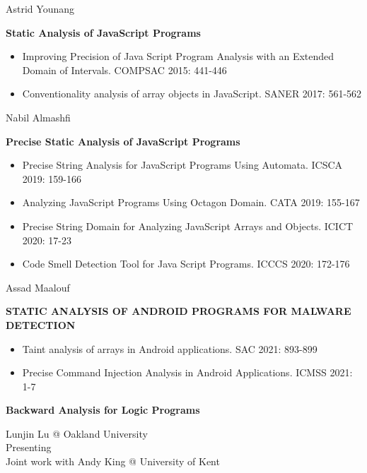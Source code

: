 \documentclass{beamer}
\begin{document}
\begin{frame}{Astrid Younang}

{\large\bf Static Analysis of JavaScript Programs
}
\begin{itemize}
\item Improving Precision of Java Script Program Analysis with an Extended Domain of Intervals. COMPSAC 2015: 441-446
\item Conventionality analysis of array objects in JavaScript. SANER 2017: 561-562
\end{itemize}

\end{frame}

\begin{frame}{Nabil Almashfi}

{\large\bf Precise Static Analysis of
JavaScript Programs
}

\begin{itemize}
  \item Precise String Analysis for JavaScript Programs Using Automata. ICSCA 2019: 159-166
  \item Analyzing JavaScript Programs Using Octagon Domain. CATA 2019: 155-167
  \item Precise String Domain for Analyzing JavaScript Arrays and Objects. ICICT 2020: 17-23
  \item Code Smell Detection Tool for Java Script Programs. ICCCS 2020: 172-176
\end{itemize}

\end{frame}

\begin{frame}{Assad Maalouf}

{\large\bf STATIC ANALYSIS OF ANDROID PROGRAMS
FOR MALWARE DETECTION}

\begin{itemize}
\item Taint analysis of arrays in Android applications. SAC 2021: 893-899
\item Precise Command Injection Analysis in Android Applications. ICMSS 2021: 1-7
\end{itemize}
\end{frame}



\begin{frame}{}

\begin{center}
{\large\bf Backward Analysis for Logic Programs}
\end{center}

\begin{center}
Lunjin Lu @ Oakland University \\
Presenting \\
Joint work with Andy King @ University of Kent
\end{center}

\end{frame}
\end{document}

